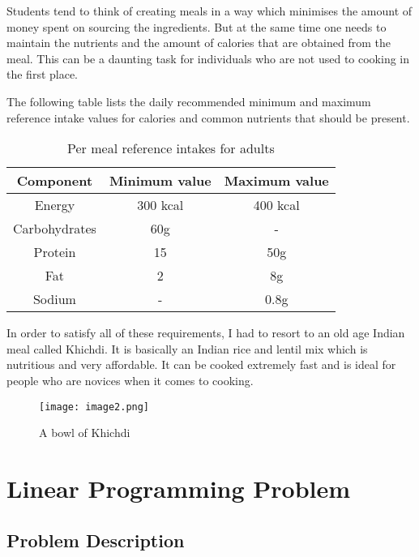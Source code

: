 \documentclass[
]{article}
\begin{document}
Students tend to think of creating meals in a way which minimises the amount of money spent on sourcing the ingredients.
But at the same time one needs to maintain the nutrients and the amount of calories that are obtained from the meal.
This can be a daunting task for individuals who are not used to cooking in the first place.

The following table lists the daily
recommended minimum and maximum reference intake values for calories and common nutrients that should be present.

\begin{table}[h!]
	\centering
	\begin{tabular}{||c c c|} 
		\hline
		Component     & Minimum value & Maximum value \\ [0.5ex] 
		\hline\hline
		Energy        & 300 kcal      & 400 kcal      \\ 
		Carbohydrates & 60g           & -             \\
		Protein       & 15            & 50g           \\
		Fat           & 2             & 8g            \\
		Sodium        & -             & 0.8g          \\ [1ex] 
		\hline
	\end{tabular}
	\caption{Per meal reference intakes for adults \cite{wiseman_1992}}
	\label{table:1}
\end{table}

In order to satisfy all of these requirements, I had to resort to an old age Indian meal called Khichdi.
It is basically an Indian rice and lentil mix which is nutritious and very affordable. It can be cooked extremely fast and is ideal for people
who are novices when it comes to cooking.

\begin{figure}[h]
	\centering
	\texttt{[image: image2.png]}
	\caption{A bowl of Khichdi}
\end{figure}

\hypertarget{linear-programming-problem}{%
	\section{Linear Programming Problem}\label{linear-programming-problem}}

\hypertarget{problem-description}{%
	\subsection{Problem Description}\label{problem-description}}
\end{document}
